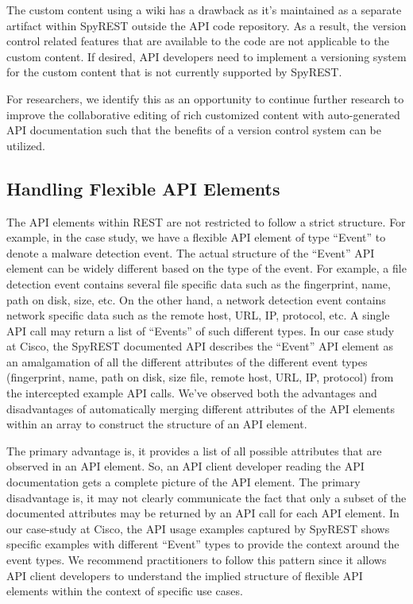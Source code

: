 \documentclass[10pt, conference]{IEEEtran}
\begin{document}
The custom content using a wiki has a drawback as it's maintained as a separate artifact within SpyREST outside the API code repository. As a result, the version control related features that are available to the code are not applicable to the custom content. If desired, API developers need to implement a versioning system for the custom content that is not currently supported by SpyREST.

For researchers, we identify this as an opportunity to continue further research to improve the collaborative editing of rich customized content with auto-generated API documentation such that the benefits of a version control system can be utilized.

\subsection{Handling Flexible API Elements}
The API elements within REST are not restricted to follow a strict structure. For example, in the case study, we have a flexible API element of type ``Event'' to denote a malware detection event. The actual structure of the ``Event'' API element can be widely different based on the type of the event. For example, a file detection event contains several file specific data such as the fingerprint, name, path on disk, size, etc. On the other hand, a network detection event contains network specific data such as the remote host, URL, IP, protocol, etc. A single API call may return a list of ``Events'' of such different types. In our case study at Cisco, the SpyREST documented API describes the ``Event'' API element as an amalgamation of all the different attributes of the different event types (fingerprint, name, path on disk, size file, remote host, URL, IP, protocol) from the intercepted example API calls. We've observed both the advantages and disadvantages of automatically merging different attributes of the API elements within an array to construct the structure of an API element.

The primary advantage is, it provides a list of all possible attributes that are observed in an API element. So, an API client developer reading the API documentation gets a complete picture of the API element. The primary disadvantage is, it may not clearly communicate the fact that only a subset of the documented attributes may be returned by an API call for each API element. In our case-study at Cisco, the API usage examples captured by SpyREST shows specific examples with different ``Event'' types to provide the context around the event types. We recommend practitioners to follow this pattern since it allows API client developers to understand the implied structure of flexible API elements within the context of specific use cases.
\end{document}
